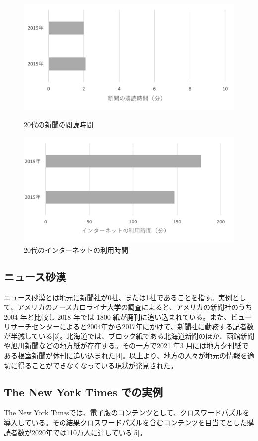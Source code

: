 \begin{figure}[htbp]
    \begin{minipage}[b]{0.45\linewidth}
        \centering
        \includegraphics[keepaspectratio, scale=0.75]{images/newspaper3.png}
        \caption{20代の新聞の閲読時間 }
    \end{minipage}
    \begin{minipage}[b]{0.45\linewidth}
        \centering
        \includegraphics[keepaspectratio, scale=0.75]{images/newspaper2.png}
        \caption{20代のインターネットの利用時間}
    \end{minipage}
\end{figure}

\subsection{ニュース砂漠}
ニュース砂漠とは地元に新聞社が0社、または1社であることを指す。実例として、アメリカのノースカロライナ大学の調査によると、アメリカの新聞社のうち 2004 年と比較し 2018 年では 1800 紙が廃刊に追い込まれている。また、ビューリサーチセンターによると2004年から2017年にかけて、新聞社に勤務する記者数が半減している[3]。北海道では、ブロック紙である北海道新聞のほか、函館新聞や旭川新聞などの地方紙が存在する。その一方で2021 年3 月には地方夕刊紙である根室新聞が休刊に追い込まれた[4]。以上より、地方の人々が地元の情報を適切に得ることができなくなっている現状が発見された。

\subsection{The New York Times での実例}
The New York Timesでは、電子版のコンテンツとして、クロスワードパズルを導入している。その結果クロスワードパズルを含むコンテンツを目当てとした購読者数が2020年では110万人に達している[5]。
